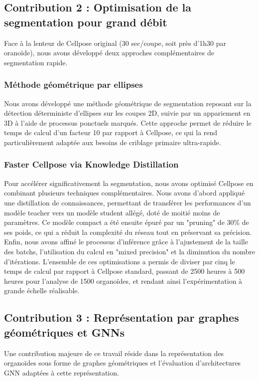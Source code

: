 \subsection{Contribution 2 : Optimisation de la segmentation pour grand débit}

Face à la lenteur de Cellpose original (30 sec/coupe, soit près d'1h30 par oranoïde), nous avons développé deux approches complémentaires de segmentation rapide.

\subsubsection{Méthode géométrique par ellipses}
Nous avons développé une méthode géométrique de segmentation reposant sur la détection déterministe d'ellipses sur les coupes 2D, suivie par un appariement en 3D à l'aide de processus ponctuels marqués. Cette approche permet de réduire le temps de calcul d'un facteur 10 par rapport à Cellpose, ce qui la rend particulièrement adaptée aux besoins de criblage primaire ultra-rapide.

\subsubsection{Faster Cellpose via Knowledge Distillation}
Pour accélérer significativement la segmentation, nous avons optimisé Cellpose en combinant plusieurs techniques complémentaires. Nous avons d'abord appliqué une distillation de connaissances, permettant de transférer les performances d'un modèle teacher vers un modèle student allégé, doté de moitié moins de paramètres. Ce modèle compact a été ensuite épuré par un "pruning" de 30\% de ses poids, ce qui a réduit la complexité du réseau tout en préservant sa précision. Enfin, nous avons affiné le processus d'inférence grâce à l'ajustement de la taille des batchs, l'utilisation du calcul en "mixed precision" et la diminution du nombre d'itérations. L'ensemble de ces optimisations a permis de diviser par cinq le temps de calcul par rapport à Cellpose standard, passant de 2500 heures à 500 heures pour l'analyse de 1500 organoïdes, et rendant ainsi l'expérimentation à grande échelle réalisable.

\subsection{Contribution 3 : Représentation par graphes géométriques et GNNs}

Une contribution majeure de ce travail réside dans la représentation des organoïdes sous forme de graphes géométriques et l'évaluation d'architectures GNN adaptées à cette représentation.

